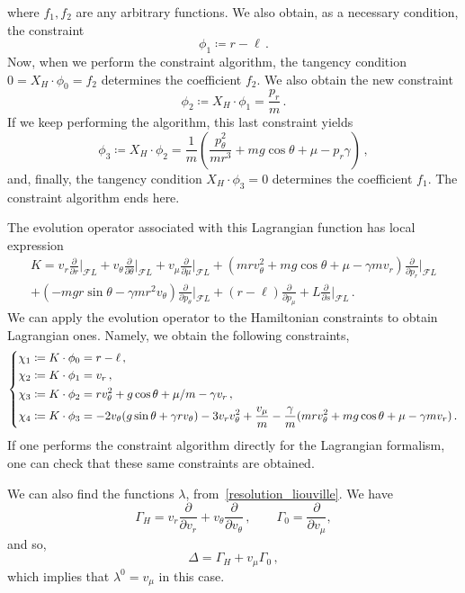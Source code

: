 \documentclass[11pt]{article}
\theoremstyle{plain}
\theoremstyle{definition}
\newcommand{\parder}[2]{\frac{\partial #1}{\partial #2}}
\def\FL{\mathcal{F} L}
\begin{document}
where $f_1,f_2$ are any arbitrary functions. We also obtain, as a necessary condition, the constraint
$$ \phi_1 \coloneqq r-\ell\,. $$
Now, when we perform the constraint algorithm, the tangency condition $0 = X_H \cdot \phi_0 = f_2$ determines the coefficient $f_2$. We also obtain the new constraint 
$$ \phi_2\coloneqq X_H \cdot \phi_1 = \frac{p_r}{m}\,. $$
If we keep performing the algorithm, this last constraint yields
$$\phi_3\coloneqq X_H\cdot\phi_2 = \frac{1}{m}\left(\frac{p_{\theta}^2}{mr^3} + mg\cos\theta + \mu -p_r\gamma\right)\,,$$
and, finally, the tangency condition $X_H\cdot \phi_3 = 0$ determines the coefficient $f_1$. The constraint algorithm ends here.


The evolution operator associated with this Lagrangian function has local expression
\begin{multline}
    K = v_r\parder{}{r}\Big|_{\FL} + v_\theta\parder{}{\theta}\Big|_{\FL} + v_\mu\parder{}{\mu}\Big|_{\FL} + \left( mrv_\theta^2 + mg\cos\theta + \mu - \gamma mv_r \right)\parder{}{p_r}\Big|_{\FL} \\+ \left( -mgr\sin\theta - \gamma mr^2v_\theta \right)\parder{}{p_\theta}\Big|_{\FL} + (r-\ell)\parder{}{p_\mu} + L\parder{}{s}\Big|_{\FL} \,.
\end{multline}
We can apply the evolution operator to the Hamiltonian constraints to obtain Lagrangian ones. Namely, we obtain the following constraints,
\begin{equation}
    \begin{dcases}
        \chi_1 \coloneqq K\cdot \phi_0 = r-\ell \,,
        \\
        \chi_2 \coloneqq K\cdot \phi_1 =  v_r\,,
        \\
        \chi_3 \coloneqq K\cdot \phi_2 = rv_\theta^2 + g\cos\theta + \mu/m -\gamma v_r\,,
        \\
        \chi_4\coloneqq K\cdot \phi_3 = -2v_{\theta}(g\sin\theta + \gamma rv_{\theta})-3v_rv_{\theta}^2 +\frac{v_\mu}{m} -\frac{\gamma}{m}(mrv_{\theta}^2+mg\cos\theta+\mu -\gamma m v_r)\,.
    \end{dcases}
\end{equation}
If one performs the constraint algorithm directly for the Lagrangian formalism, one can check that these same constraints are obtained.

We can also find the functions $\lambda$, from~\eqref{resolution_liouville}. We have
\begin{equation}
    \Gamma_ H = v_r \parder{}{v_r} + v_{\theta} \parder{}{v_{\theta}}\,, \qquad \Gamma_0 = \parder{}{v_\mu},
\end{equation}
and so,
$$\Delta = \Gamma_H + v_{\mu}\Gamma_0\,,$$
which implies that $\lambda^0 = v_{\mu}$ in this case.
\end{document}
